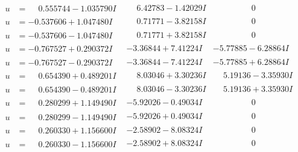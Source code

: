 \documentclass[1p]{elsarticle_modified}
\theoremstyle{definition}
\begin{document}
$$\begin{array}{c|c|c}
\begin{aligned}
u &= \phantom{-}0.555744 - 1.035790 I\end{aligned}
 & \phantom{-}6.42783 - 1.42029 I & \phantom{-0.000000 } 0 \\ \hline\begin{aligned}
u &= -0.537606 + 1.047480 I\end{aligned}
 & \phantom{-}0.71771 - 3.82158 I & \phantom{-0.000000 } 0 \\ \hline\begin{aligned}
u &= -0.537606 - 1.047480 I\end{aligned}
 & \phantom{-}0.71771 + 3.82158 I & \phantom{-0.000000 } 0 \\ \hline\begin{aligned}
u &= -0.767527 + 0.290372 I\end{aligned}
 & -3.36844 + 7.41224 I & -5.77885 - 6.28864 I \\ \hline\begin{aligned}
u &= -0.767527 - 0.290372 I\end{aligned}
 & -3.36844 - 7.41224 I & -5.77885 + 6.28864 I \\ \hline\begin{aligned}
u &= \phantom{-}0.654390 + 0.489201 I\end{aligned}
 & \phantom{-}8.03046 + 3.30236 I & \phantom{-}5.19136 - 3.35930 I \\ \hline\begin{aligned}
u &= \phantom{-}0.654390 - 0.489201 I\end{aligned}
 & \phantom{-}8.03046 - 3.30236 I & \phantom{-}5.19136 + 3.35930 I \\ \hline\begin{aligned}
u &= \phantom{-}0.280299 + 1.149490 I\end{aligned}
 & -5.92026 - 0.49034 I & \phantom{-0.000000 } 0 \\ \hline\begin{aligned}
u &= \phantom{-}0.280299 - 1.149490 I\end{aligned}
 & -5.92026 + 0.49034 I & \phantom{-0.000000 } 0 \\ \hline\begin{aligned}
u &= \phantom{-}0.260330 + 1.156600 I\end{aligned}
 & -2.58902 - 8.08324 I & \phantom{-0.000000 } 0 \\ \hline\begin{aligned}
u &= \phantom{-}0.260330 - 1.156600 I\end{aligned}
 & -2.58902 + 8.08324 I & \phantom{-0.000000 } 0 \\ \hline\begin{aligned}

\end{aligned}
\end{array}$$
\end{document}
